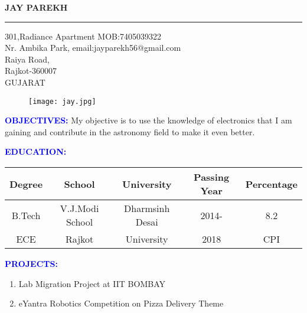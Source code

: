 \documentclass{article}
\begin{document}
	\begin{center}
		\huge \textbf{JAY PAREKH}
	\end{center}
	 \hrule 
\vspace{0.1in} 
\begin{flushleft}
\large 301,Radiance Apartment \hspace{0.6in} MOB:7405039322 \\
Nr. Ambika Park, \hspace{1.1in} email:jayparekh56@gmail.com\\
Raiya Road, \\
Rajkot-360007 \\
GUJARAT
\end{flushleft}

\begin{figure}[h]
	\centering
	\hspace{2in}
	\texttt{[image: jay.jpg]}
	\label{fig_1}
\end{figure}
\begin{flushleft}
	\textcolor{blue}{\textbf{OBJECTIVES:}} My objective is to use the knowledge of electronics that I am gaining and contribute in the astronomy field to make it even better.    
\end{flushleft}
\begin{flushleft}
	\textcolor{blue}{\textbf{EDUCATION:}}			
	\begin{tabular}{|c|c|c|c|c|}
		\hline
		Degree&School&University&Passing Year&Percentage \\
		\hline
		B.Tech&V.J.Modi School&Dharmsinh Desai&2014-&8.2\\
		ECE&Rajkot&University&2018&CPI\\
		\hline
	\end{tabular}		 
\end{flushleft}
\begin{flushleft}
	\textcolor{blue}{\textbf{PROJECTS:}}
	\begin{enumerate}
		\vspace{-0.29in}
		\addtolength{\itemindent}{1.0in}
		\item Lab Migration Project at IIT BOMBAY
		\item eYantra Robotics Competition on Pizza Delivery Theme
	\end{enumerate}	
\end{flushleft}
\end{document}
